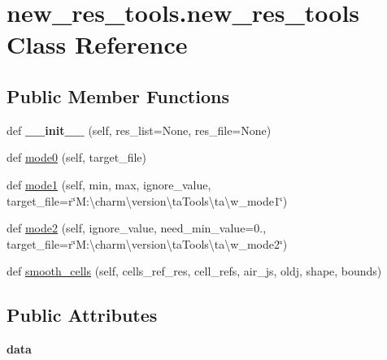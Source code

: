 \hypertarget{classnew__res__tools_1_1new__res__tools}{}\section{new\+\_\+res\+\_\+tools.\+new\+\_\+res\+\_\+tools Class Reference}
\label{classnew__res__tools_1_1new__res__tools}
\subsection*{Public Member Functions}
\begin{DoxyCompactItemize}
\item 
\mbox{\label{classnew__res__tools_1_1new__res__tools_a33a3c069bc85a275398bbde348966e38}} 
def {\bfseries \+\_\+\+\_\+init\+\_\+\+\_\+} (self, res\+\_\+list=None, res\+\_\+file=None)
\item 
def \hyperlink{classnew__res__tools_1_1new__res__tools_aa088ef1d63848aec177552b6e94ebbbf}{mode0} (self, target\+\_\+file)
\item 
def \hyperlink{classnew__res__tools_1_1new__res__tools_a58bd123c2c81266295228e3f31fc5703}{mode1} (self, min, max, ignore\+\_\+value, target\+\_\+file=r\char`\"{}M\+:\textbackslash{}charm\textbackslash{}version\textbackslash{}ta\+Tools\textbackslash{}ta\textbackslash{}w\+\_\+mode1\char`\"{})
\item 
def \hyperlink{classnew__res__tools_1_1new__res__tools_aebe00bcd2bfd2ff3c6b9b37a43aad986}{mode2} (self, ignore\+\_\+value, need\+\_\+min\+\_\+value=0., target\+\_\+file=r\char`\"{}M\+:\textbackslash{}charm\textbackslash{}version\textbackslash{}ta\+Tools\textbackslash{}ta\textbackslash{}w\+\_\+mode2\char`\"{})
\item 
def \hyperlink{classnew__res__tools_1_1new__res__tools_a96a6b58a3dc3288188605d01baaef30b}{smooth\+\_\+cells} (self, cells\+\_\+ref\+\_\+res, cell\+\_\+refs, air\+\_\+js, oldj, shape, bounds)
\end{DoxyCompactItemize}
\subsection*{Public Attributes}
\begin{DoxyCompactItemize}
\item 
\mbox{\label{classnew__res__tools_1_1new__res__tools_a1cd87773eacef322f1c0be64f8d9a0ae}} 
{\bfseries data}
\end{DoxyCompactItemize}


